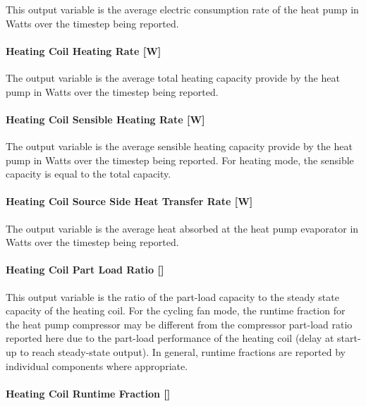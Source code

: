 This output variable is the average electric consumption rate of the heat pump in Watts over the timestep being reported.

\paragraph{Heating Coil Heating Rate {[}W{]}}\label{heating-coil-heating-rate-w-2}

The output variable is the average total heating capacity provide by the heat pump in Watts over the timestep being reported.

\paragraph{Heating Coil Sensible Heating Rate {[}W{]}}\label{heating-coil-sensible-heating-rate-w}

The output variable is the average sensible heating capacity provide by the heat pump in Watts over the timestep being reported. For heating mode, the sensible capacity is equal to the total capacity.

\paragraph{Heating Coil Source Side Heat Transfer Rate {[}W{]}}\label{heating-coil-source-side-heat-transfer-rate-w}

The output variable is the average heat absorbed at the heat pump evaporator in Watts over the timestep being reported.

\paragraph{\texorpdfstring{Heating Coil Part Load Ratio {[]}}{Heating Coil Part Load Ratio }}\label{heating-coil-part-load-ratio}

This output variable is the ratio of the part-load capacity to the steady state capacity of the heating coil. For the cycling fan mode, the runtime fraction for the heat pump compressor may be different from the compressor part-load ratio reported here due to the part-load performance of the heating coil (delay at start-up to reach steady-state output). In general, runtime fractions are reported by individual components where appropriate.

\paragraph{\texorpdfstring{Heating Coil Runtime Fraction {[]}}{Heating Coil Runtime Fraction }}\label{heating-coil-runtime-fraction-6}

